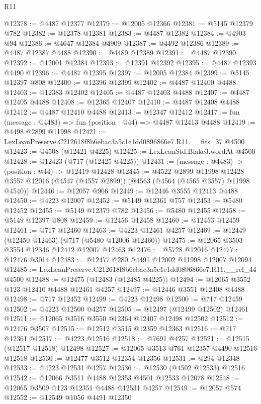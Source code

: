 \begin{lexlean}{R11}
\begin{coremodule}
@12378 := @4487 @12377
@12379 := @12005 @12366
@12381 := @5145 @12379 @782
@12382 := @12378 @12381
@12383 := @4487 @12382
@12384 := @4903 @94
@12386 := @4647 @12384 @4909
@12387 := @4492 @12386
@12389 := @4487 @12387 @4488
@12390 := @4489 @12389
@12391 := @4487 @12390
@12392 := @12001 @12384
@12393 := @12391 @12392
@12395 := @4487 @12393 @4490
@12396 := @4487 @12395
@12397 := @12005 @12384
@12399 := @5145 @12397 @808
@12400 := @12396 @12399
@12402 := @4487 @12400 @4488
@12403 := @12383 @12402
@12405 := @4487 @12403 @4488
@12407 := @4487 @12405 @4488
@12408 := @12365 @12407
@12410 := @4487 @12408 @4488
@12412 := @4487 @12410 @4488
@12413 := @12347 @12412
@12417 := fun (message : @4483) => fun (position : @44) => @4487 @12413 @4488
@12419 := @4498 @2899 @11998
@12421 := LexLeanPreserve.C212618f8b6ebac3a5c1e1dd0896866e7.R11.__fits_37 @4500
@12423 := @4508 (@12421 @4225)
@12425 := LexLeanStd.Blake3.wordAt @4500
@12428 := @12423 (@717 (@12425 @4225))
@12431 := (message : @4483) -> (position : @44) -> @12419 @12428
@12445 := @4522
    @2899
    @11998
    @12428
    @3557
    @12016
    (@4547 (@4557 @2899))
    (@4563 (@4564 (@4565 @3557) @11998 @4540))
@12446 := @12057 @966
@12449 := @12446 @3555 @12413 @4488
@12450 := @4223 @12007
@12452 := @5149 @12361 @757
@12453 := @5480 @12452
@12455 := @5149 @12379 @782
@12456 := @5480 @12455
@12458 := @5149 @12397 @808
@12459 := @12456 @12458
@12460 := @12453 @12459
@12461 := @717 @12460
@12463 := @4223 @12461 @4257
@12469 := @12449 (@12450 @12463) (@717 (@5480 @12006 @12460))
@12475 := @12065 @3503 @3554 @12346 @12412 @12007 @12463
@12476 := @5728 @12016
@12477 := @12476 @3014
@12483 := @12477 @280 @4491 @12002 @11998 @12007 @12094
@12485 := LexLeanPreserve.C212618f8b6ebac3a5c1e1dd0896866e7.R11.__rel_44 @4500
@12488 := @12475 (@12483 (@12485 @4225))
@12494 := @12065 @3552 @123 @12410 @4488 @12461 @4257
@12497 := @12446 @3551 @12408 @4488
@12498 := @717 @12452
@12499 := @4223 @12498
@12500 := @717 @12459
@12502 := @4223 @12500 @4257
@12505 := @12497 (@12499 @12502) @12461
@12511 := @12065 @3516 @3550 @12364 @12407 @12498 @12502
@12512 := @12476 @3507
@12515 := @12512 @3515 @12359 @12363
@12516 := @717 @12361
@12517 := @4223 @12516
@12518 := @7691 @4257
@12521 := @12515 (@12517 @12518) @12498
@12527 := @12065 @3513 @761 @12357 @4490 @12516 @12518
@12530 := @12477 @3512 @12354 @12356
@12531 := @294 @12348
@12533 := @4223 @12531 @4257
@12536 := @12530 (@4502 @12533) @12516
@12542 := @12066 @3511 @4488 @12353 @4501 @12533 @12078
@12548 := @12065 @3509 @123 @12351 @4488 @12531 @4257
@12549 := @12057 @574
@12552 := @12549 @1056 @4491 @12350

\end{coremodule}
\end{lexlean}
